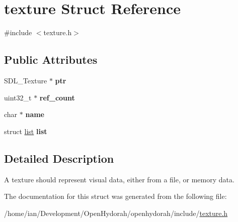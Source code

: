\hypertarget{structtexture}{\section{texture Struct Reference}
\label{structtexture}
}


{\ttfamily \#include $<$texture.\-h$>$}

\subsection*{Public Attributes}
\begin{DoxyCompactItemize}
\item 
\hypertarget{structtexture_a6c04d93f3a3008f8d549993e89a4bb1a}{S\-D\-L\-\_\-\-Texture $\ast$ {\bfseries ptr}}\label{structtexture_a6c04d93f3a3008f8d549993e89a4bb1a}

\item 
\hypertarget{structtexture_aa0ae3bfb313fc67ba150265edca51027}{uint32\-\_\-t $\ast$ {\bfseries ref\-\_\-count}}\label{structtexture_aa0ae3bfb313fc67ba150265edca51027}

\item 
\hypertarget{structtexture_aa9b93079a55f5d13c0b2fb1082b1c655}{char $\ast$ {\bfseries name}}\label{structtexture_aa9b93079a55f5d13c0b2fb1082b1c655}

\item 
\hypertarget{structtexture_ad2a1fa83621f554c805eb6374ddbc4bb}{struct \hyperlink{structlist}{list} {\bfseries list}}\label{structtexture_ad2a1fa83621f554c805eb6374ddbc4bb}

\end{DoxyCompactItemize}


\subsection{Detailed Description}
A texture should represent visual data, either from a file, or memory data. 

The documentation for this struct was generated from the following file\-:\begin{DoxyCompactItemize}
\item 
/home/ian/\-Development/\-Open\-Hydorah/openhydorah/include/\hyperlink{texture_8h}{texture.\-h}\end{DoxyCompactItemize}
